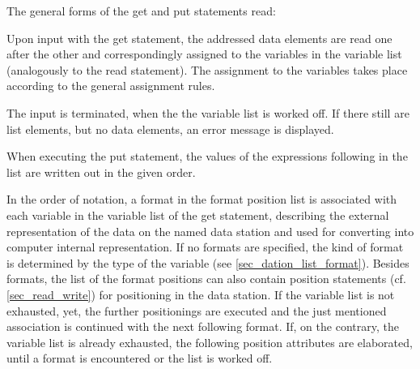 The general forms of the get and put statements read:

\begin{grammarframe}





\end{grammarframe}

Upon input with the get statement, the addressed data elements are
read one after the other and correspondingly assigned to the variables
in the variable list (analogously to the read statement). The
assignment to the variables takes place according to the general
assignment rules.

The input is terminated, when the the variable list is worked off. If
there still are list elements, but no data elements, an error message is
displayed.

When executing the put statement, the values of the expressions
following  in the list are written out in the given order.

In the order of notation, a format in the format position list is
associated with each variable in the variable list of the get
statement, describing the external representation of the data on the
named data station and used for converting into computer internal
representation. 
If no formats are specified, the kind of format is determined by the
type of the variable (see  \ref{sec_dation_list_format}).
Besides formats, the list of the format positions can also
contain position statements (cf. \ref{sec_read_write})
for positioning in the data
station. If the variable list is not exhausted, yet, the further
positionings are executed and the just mentioned association is
continued with the next following format. If, on the contrary, the
variable list is already exhausted, the following position attributes
are elaborated, until a format is encountered or the list is worked off.

